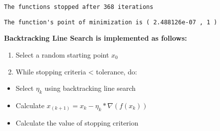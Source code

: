 \documentclass[
  letterpaper,
  DIV=11,
  numbers=noendperiod]{scrartcl}
\newenvironment{Shaded}{\begin{snugshade}}{\end{snugshade}}
\newcommand{\DecValTok}[1]{\textcolor[rgb]{0.68,0.00,0.00}{#1}}
\newcommand{\FunctionTok}[1]{\textcolor[rgb]{0.28,0.35,0.67}{#1}}
\newcommand{\NormalTok}[1]{\textcolor[rgb]{0.00,0.23,0.31}{#1}}
\newcommand{\SpecialCharTok}[1]{\textcolor[rgb]{0.37,0.37,0.37}{#1}}
\newcommand{\StringTok}[1]{\textcolor[rgb]{0.13,0.47,0.30}{#1}}
\providecommand{\tightlist}{%
  \setlength{\itemsep}{0pt}\setlength{\parskip}{0pt}}\usepackage{longtable,booktabs,array}
\begin{document}
\begin{Shaded}
\end{Shaded}

\begin{verbatim}
The functions stopped after 368 iterations 
\end{verbatim}

\begin{Shaded}
\end{Shaded}

\begin{verbatim}
The function's point of minimization is ( 2.488126e-07 , 1 ) 
\end{verbatim}

\textbf{Backtracking Line Search is implemented as follows:}

\begin{enumerate}
\def\labelenumi{\arabic{enumi}.}
\tightlist
\item
  Select a random starting point \(x_0\)\\
\item
  While stopping criteria \textless{} tolerance, do:
\end{enumerate}

\begin{itemize}
\tightlist
\item
  Select \(η_k\) using backtracking line search
\item
  Calculate \(x_{(k+1)} = x_k - η_k * ∇(f(x_k))\)\\
\item
  Calculate the value of stopping criterion
\end{itemize}
\end{document}
